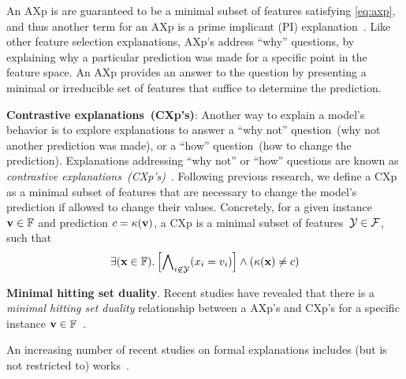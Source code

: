 An AXp is are guaranteed to be a minimal subset of features satisfying \autoref{eq:axp},
and thus another term for an AXp is a prime implicant (PI) explanation~\cite{inms-aaai19}.
%
Like other feature selection explanations, AXp's address ``why'' questions,
by explaining why a particular prediction was made for a specific point 
in the feature space.
%
An AXp provides an answer to the question by presenting a minimal or irreducible 
set of features that suffice to determine the prediction.

\textbf{Contrastive explanations~(CXp's)}: 
Another way to explain a model's behavior is to explore explanations to
answer a ``why not'' question~(why not another prediction was made), 
or a ``how'' question~(how to change the prediction).
%
Explanations addressing ``why not'' or ``how'' questions are known as
\emph{contrastive explanations~(CXp's)}~\cite{miller-aij19,inams-aiia20,msi-aaai22}. 
%
Following previous research, we define a CXp as a minimal subset of features
that are necessary to change the model's prediction if allowed to change their values.
%
Concretely, for a given instance $\mathbf{v} \in \mathbb{F}$ and 
prediction $c = \kappa(\mathbf{v})$, a CXp is a 
minimal subset of features~${\mathcal{Y}} \in {\mathcal{F}}$, such that
\begin{equation}\label{eq:cxp}
	\exists(\mathbf{x}\in\mathbb{F}).\left[\bigwedge\nolimits_{i\not\in{\mathcal{Y}}}(x_i=v_i)\right]\land(\kappa(\mathbf{x})\not=c)
\end{equation}

\textbf{Minimal hitting set duality}. 
%
Recent studies have revealed that there is a \emph{minimal hitting set duality} relationship
between a AXp's and CXp's for a specific instance $\mathbf{v} \in \mathbb{F}$~\cite{inams-aiia20,reiter-aij87}.
%
%


An increasing number of recent studies on formal explanations includes (but is not restricted to)
works~\cite{msgcin-icml21,barcelo-nips21,kutyniok-jair21,darwiche-jair21,kwiatkowska-ijcai21,mazure-cikm21,tan-nips21,rubin-aaai22,msi-aaai22,an-ijcai22,leite-kr22,barcelo-nips22}.
